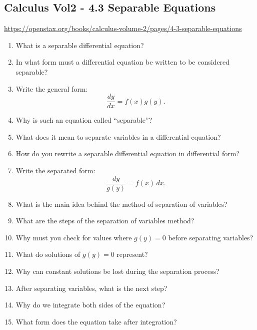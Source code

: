 \subsection{Calculus Vol2 - 4.3 Separable Equations}

\url{https://openstax.org/books/calculus-volume-2/pages/4-3-separable-equations}

\begin{enumerate}

\item What is a separable differential equation?

\item In what form must a differential equation be written to be considered separable?

\item Write the general form:
  \[
    \frac{dy}{dx} = f(x)g(y).
  \]

\item Why is such an equation called “separable”?

\item What does it mean to separate variables in a differential equation?

\item How do you rewrite a separable differential equation in differential form?

\item Write the separated form:
  \[
    \frac{dy}{g(y)} = f(x)\,dx.
  \]

\item What is the main idea behind the method of separation of variables?

\item What are the steps of the separation of variables method?

\item Why must you check for values where $g(y)=0$ before separating variables?

\item What do solutions of $g(y)=0$ represent?

\item Why can constant solutions be lost during the separation process?

\item After separating variables, what is the next step?

\item Why do we integrate both sides of the equation?

\item What form does the equation take after integration?


\end{enumerate}
